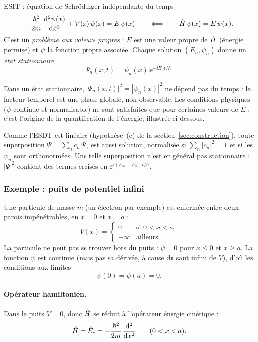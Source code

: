 \begin{resultat}{ESIT : équation de Schrödinger indépendante du temps}
\[
  -\frac{\hbar^2}{2m}\,\frac{\mathrm{d}^2\psi(x)}{\mathrm{d} x^2}+V(x)\,\psi(x)=E\,\psi(x)
  \qquad\Longleftrightarrow\qquad
  \hat{H}\,\psi(x)=E\,\psi(x).
\]
C'est un \emph{problème aux valeurs propres} : $E$ est une valeur propre de $\hat{H}$
(énergie permise) et $\psi$ la fonction propre associée. Chaque solution
$(E_n,\psi_n)$ donne un \emph{état stationnaire}
\[
  \Psi_n(x,t)=\psi_n(x)\,\ee^{-\ii E_nt/\hbar}.
\]
\end{resultat}

Dans un état stationnaire, $|\Psi_n(x,t)|^2=|\psi_n(x)|^2$ ne dépend pas du temps :
le facteur temporel est une phase globale, non observable. Les conditions physiques
($\psi$ continue et normalisable) ne sont satisfaites que pour certaines valeurs de
$E$ : c'est l'origine de la quantification de l'énergie, illustrée ci-dessous.

Comme l'ESDT est linéaire (hypothèse~(c) de la section~\ref{sec:construction}), toute
superposition $\Psi=\sum_n c_n\,\Psi_n$ est aussi solution, normalisée si
$\sum_n|c_n|^2=1$ et si les $\psi_n$ sont orthonormées. Une telle superposition
n'est en général pas stationnaire : $|\Psi|^2$ contient des termes croisés en
$\ee^{\ii(E_m-E_n)t/\hbar}$.

\subsubsection{Exemple : puits de potentiel infini}

Une particule de masse $m$ (un électron par exemple) est enfermée entre deux parois
impénétrables, en $x=0$ et $x=a$ :
\[
  V(x)=
  \begin{cases}
    0 & \text{si } 0<x<a,\\
    +\infty & \text{ailleurs.}
  \end{cases}
\]
La particule ne peut pas se trouver hors du puits : $\psi=0$ pour $x\le0$ et
$x\ge a$. La fonction $\psi$ est continue (mais pas sa dérivée, à cause du saut
infini de $V$), d'où les conditions aux limites
\[
  \psi(0)=\psi(a)=0 .
\]

\paragraph{Opérateur hamiltonien.} Dans le puits $V=0$, donc $\hat{H}$ se réduit à
l'opérateur énergie cinétique :
\[
  \hat{H}=\hat E_c=-\frac{\hbar^2}{2m}\,\frac{\mathrm{d}^2}{\mathrm{d} x^2}\qquad(0<x<a).
\]

